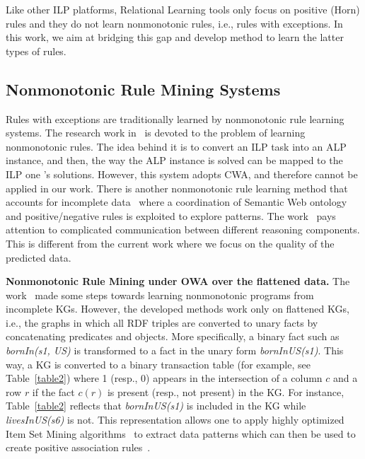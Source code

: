 Like other ILP platforms, Relational Learning tools only focus on positive (Horn) rules and they do not learn nonmonotonic rules, i.e., rules with exceptions. In this work, we aim at bridging this gap and develop method to learn the latter types of rules.

\subsection{Nonmonotonic Rule Mining Systems}
\label{related-work-nonmonotonic-rule-mining-systems}

Rules with exceptions are traditionally learned by nonmonotonic rule learning systems. The research work in~\cite{ref32} is devoted to the problem of learning nonmonotonic rules. The idea behind it is to convert an ILP task into an ALP~\cite{ref31} instance, and then, the way the ALP instance is solved can be mapped to the ILP one 's solutions. However, this system adopts CWA, and therefore cannot be applied in our work. There is another nonmonotonic rule learning method that accounts for incomplete data~\cite{ref34} where a coordination of Semantic Web ontology and positive/negative rules is exploited to explore patterns. The work~\cite{ref34} pays attention to complicated communication between different reasoning components. This is different from the current work where we focus on the quality of the predicted data.

\textbf{Nonmonotonic Rule Mining under OWA over the flattened data.} The work~\cite{ref12} made some steps towards learning nonmonotonic programs from incomplete KGs. However, the developed methods work only on flattened KGs, i.e., the graphs in which all RDF triples are converted to unary facts by concatenating predicates and objects. More specifically, a binary fact such as \textit{bornIn(s1, US)} is transformed to a fact in the unary form \textit{bornInUS(s1)}. This way, a KG is converted to a binary transaction table (for example, see Table~\ref{table2}) where 1 (resp., 0) appears in the intersection of a column $c$ and a row $r$ if the fact $c(r)$ is present (resp., not present) in the KG. For instance, Table~\ref{table2} reflects that \textit{bornInUS(s1)} is included in the KG while \textit{livesInUS(s6)} is not. This representation allows one to apply highly optimized Item Set Mining algorithms~\cite{ref37} to extract data patterns which can then be used to create positive association rules~\cite{ref13}.

